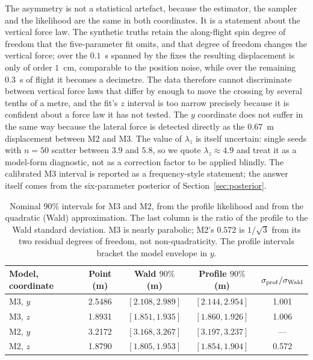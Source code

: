 The asymmetry is not a statistical artefact, because the estimator, the sampler
and the likelihood are the same in both coordinates. It is a statement about the
vertical force law. The synthetic truths retain the along-flight spin degree of
freedom that the five-parameter fit omits, and that degree of freedom changes the
vertical force; over the $0.1$~s spanned by the fixes the resulting displacement
is only of order $1$~cm, comparable to the position noise, while over the
remaining $0.3$~s of flight it becomes a decimetre. The data therefore cannot
discriminate between vertical force laws that differ by enough to move the
crossing by several tenths of a metre, and the fit's $z$ interval is too narrow
precisely because it is confident about a force law it has not tested. The $y$
coordinate does not suffer in the same way because the lateral force is detected
directly as the $0.67$~m displacement between M2 and M3. The value of
$\lambda_z$ is itself uncertain: single seeds with $n=50$ scatter between $3.9$
and $5.8$, so we quote $\lambda_z\approx4.9$ and treat it as a model-form
diagnostic, not as a correction factor to be applied blindly. The calibrated M3
interval is reported as a frequency-style statement; the answer itself comes from
the six-parameter posterior of Section~\ref{sec:posterior}.

\begin{table}[t]
  \centering
  \caption{Nominal $90\%$ intervals for M3 and M2, from the profile likelihood and
  from the quadratic (Wald) approximation. The last column is the ratio of the
  profile to the Wald standard deviation. M3 is nearly parabolic; M2's $0.572$ is
  $1/\sqrt{3}$ from its two residual degrees of freedom, not non-quadraticity.
  The profile intervals bracket the model envelope in $y$.}
  \label{tab:intervals}
  \small
  \begin{tabular}{@{}lcccc@{}}
    \toprule
    Model, coordinate & Point (m) & Wald $90\%$ (m) & Profile $90\%$ (m) & $\sigma_{\rm prof}/\sigma_{\rm Wald}$ \\
    \midrule
    M3, $y$ & 2.5486 & $[2.108,2.989]$ & $[2.144,2.954]$ & 1.001 \\
    M3, $z$ & 1.8931 & $[1.851,1.935]$ & $[1.860,1.926]$ & 1.006 \\
    M2, $y$ & 3.2172 & $[3.168,3.267]$ & $[3.197,3.237]$ & --- \\
    M2, $z$ & 1.8790 & $[1.805,1.953]$ & $[1.854,1.904]$ & 0.572 \\
    \bottomrule
  \end{tabular}
\end{table}


